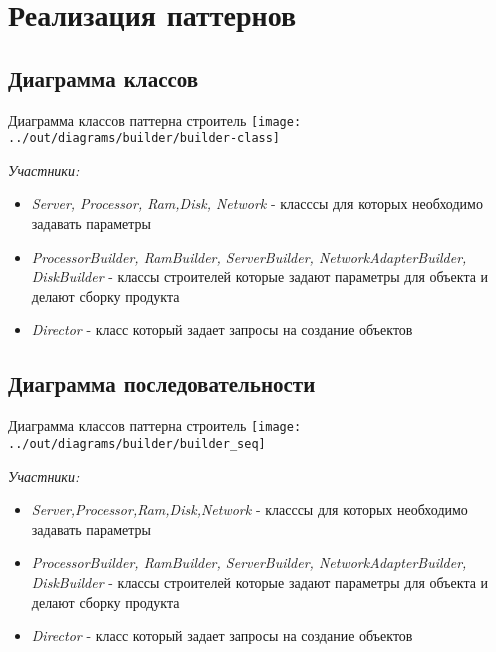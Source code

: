 \documentclass[PI,LAB]{HSEUniversity}
\begin{document}
    \chapter{Реализация паттернов}

    \section{Диаграмма классов}
     \begin{FIGURE}[h]{Диаграмма классов паттерна строитель\label{fig:example-figure}}
    	\texttt{[image: ../out/diagrams/builder/builder-class]}
    \end{FIGURE}
	\emph{Участники:}
	\begin{itemize}
		\item \emph{Server, Processor, Ram,Disk, Network} - класссы для которых необходимо задавать параметры
		\item \emph{ProcessorBuilder, RamBuilder, ServerBuilder, NetworkAdapterBuilder, DiskBuilder} - классы строителей которые задают параметры для объекта и делают сборку продукта
		\item \emph{Director} - класс который задает запросы на создание объектов
	\end{itemize}
\pagebreak
    \section{Диаграмма последовательности }
  
	\begin{FIGURE}[h]{Диаграмма классов паттерна строитель\label{fig:example-figure}}
		\texttt{[image: ../out/diagrams/builder/builder\_seq]}
	\end{FIGURE}
	\emph{Участники:}
\begin{itemize}
	\item \emph{Server,Processor,Ram,Disk,Network} - класссы для которых необходимо задавать параметры
	\item \emph{ProcessorBuilder, RamBuilder, ServerBuilder, NetworkAdapterBuilder, DiskBuilder} - классы строителей которые задают параметры для объекта и делают сборку продукта
	\item \emph{Director} - класс который задает запросы на создание объектов
\end{itemize}
   
\end{document}
